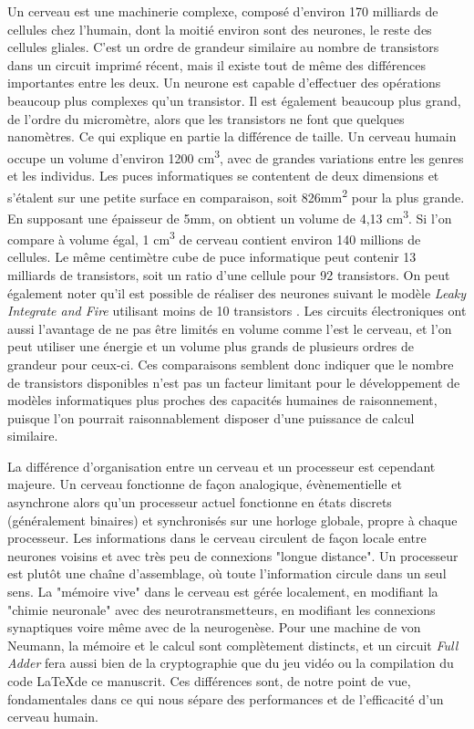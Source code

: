 	Un cerveau est une machinerie complexe, composé d'environ 170 milliards de cellules chez l'humain, dont la moitié environ sont des neurones, le reste des cellules gliales. C'est un ordre de grandeur similaire au nombre de transistors dans un circuit imprimé récent, mais il existe tout de même des différences importantes entre les deux. Un neurone est capable d'effectuer des opérations beaucoup plus complexes qu'un transistor. Il est également beaucoup plus grand, de l'ordre du micromètre, alors que les transistors ne font que quelques nanomètres. Ce qui explique en partie la différence de taille. Un cerveau humain occupe un volume d'environ 1200 cm\textsuperscript{3}, avec de grandes variations entre les genres et les individus. Les puces informatiques se contentent de deux dimensions et s'étalent sur une petite surface en comparaison, soit 826mm\textsuperscript{2} pour la plus grande. En supposant une épaisseur de 5mm, on obtient un volume de 4,13 cm\textsuperscript{3}. Si l'on compare à volume égal, 1 cm\textsuperscript{3} de cerveau contient environ 140 millions de cellules. Le même centimètre cube de puce informatique peut contenir 13 milliards de transistors, soit un ratio d'une cellule pour 92 transistors. On peut également noter qu'il est possible de réaliser des neurones suivant le modèle \textit{Leaky Integrate and Fire} utilisant moins de 10 transistors \cite{park2021integrate}. Les circuits électroniques ont aussi l'avantage de ne pas être limités en volume comme l'est le cerveau, et l'on peut utiliser une énergie et un volume plus grands de plusieurs ordres de grandeur pour ceux-ci. Ces comparaisons semblent donc indiquer que le nombre de transistors disponibles n'est pas un facteur limitant pour le développement de modèles informatiques plus proches des capacités humaines de raisonnement, puisque l'on pourrait raisonnablement disposer d'une puissance de calcul similaire.

	La différence d'organisation entre un cerveau et un processeur est cependant majeure. Un cerveau fonctionne de façon analogique, évènementielle et asynchrone alors qu'un processeur actuel fonctionne en états discrets (généralement binaires) et synchronisés sur une horloge globale, propre à chaque processeur. Les informations dans le cerveau circulent de façon locale entre neurones voisins et avec très peu de connexions "longue distance". Un processeur est plutôt une chaîne d'assemblage, où toute l'information circule dans un seul sens. La "mémoire vive" dans le cerveau est gérée localement, en modifiant la "chimie neuronale" avec des neurotransmetteurs, en modifiant les connexions synaptiques voire même avec de la neurogenèse. Pour une machine de von Neumann, la mémoire et le calcul sont complètement distincts, et un circuit \textit{Full Adder} fera aussi bien de la cryptographie que du jeu vidéo ou la compilation du code \LaTeX de ce manuscrit. Ces différences sont, de notre point de vue, fondamentales dans ce qui nous sépare des performances et de l'efficacité d'un cerveau humain.

